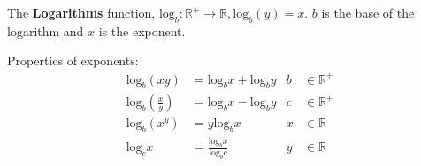 The \textbf{Logarithms} function, $\text{log}_b: \mathbb{R}^+ \rightarrow \mathbb{R}, \text{log}_b(y) = x$.
$b$ is the base of the logarithm and $x$ is the exponent.

Properties of exponents:
\begin{align*}
  \text{log}_b(xy)          & = \text{log}_bx + \text{log}_by       & b & \in \mathbb{R}^+ \\
  \text{log}_b(\frac{x}{y}) & = \text{log}_bx - \text{log}_by       & c & \in \mathbb{R}^+ \\
  \text{log}_b(x^y)         & = y\text{log}_bx                      & x & \in \mathbb{R}   \\
  \text{log}_cx             & = \frac{\text{log}_bx}{\text{log}_bc} & y & \in \mathbb{R}
\end{align*}
